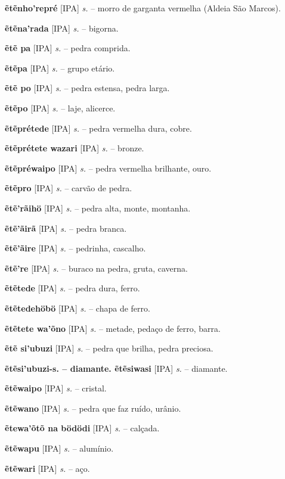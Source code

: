 \textbf{ẽtẽnho'repré} [IPA] \textit{s.} -- morro de garganta vermelha (Aldeia São Marcos).

\textbf{ẽtẽna'rada} [IPA] \textit{s.} -- bigorna.

\textbf{ẽtẽ pa} [IPA] \textit{s.} -- pedra comprida.

\textbf{ẽtẽpa} [IPA] \textit{s.} -- grupo etário.

\textbf{ẽtẽ po} [IPA] \textit{s.} -- pedra estensa, pedra larga.

\textbf{ẽtẽpo} [IPA] \textit{s.} -- laje, alicerce.

\textbf{ẽtẽprétede} [IPA] \textit{s.} -- pedra vermelha dura, cobre.

\textbf{ẽtẽprétete wazari} [IPA] \textit{s.} -- bronze.

\textbf{ẽtẽpréwaipo} [IPA] \textit{s.} -- pedra vermelha brilhante, ouro.

\textbf{ẽtẽpro} [IPA] \textit{s.} -- carvão de pedra.

\textbf{ẽtẽ'rãihö} [IPA] \textit{s.} -- pedra alta, monte, montanha.

\textbf{ẽtẽ'ãirã} [IPA] \textit{s.} -- pedra branca.

\textbf{ẽtẽ'ãire} [IPA] \textit{s.} -- pedrinha, cascalho.

\textbf{ẽtẽ're} [IPA] \textit{s.} -- buraco na pedra, gruta, caverna.

\textbf{ẽtẽtede} [IPA] \textit{s.} -- pedra dura, ferro.

\textbf{ẽtẽtedehöbö} [IPA] \textit{s.} -- chapa de ferro.

\textbf{ẽtẽtete wa'õno} [IPA] \textit{s.} -- metade, pedaço de ferro, barra.

\textbf{ẽtẽ si'ubuzi} [IPA] \textit{s.} -- pedra que brilha, pedra preciosa.

\textbf{ẽtẽsi'ubuzi-s. -- diamante. ẽtẽsiwasi} [IPA] \textit{s.} -- diamante.

\textbf{ẽtẽwaipo} [IPA] \textit{s.} -- cristal.

\textbf{ẽtẽwano} [IPA] \textit{s.} -- pedra que faz ruído, urânio.

\textbf{ẽtewa'õtõ na bödödi} [IPA] \textit{s.} -- calçada.

\textbf{ẽtẽwapu} [IPA] \textit{s.} -- alumínio.

\textbf{ẽtẽwari} [IPA] \textit{s.} -- aço.   %

